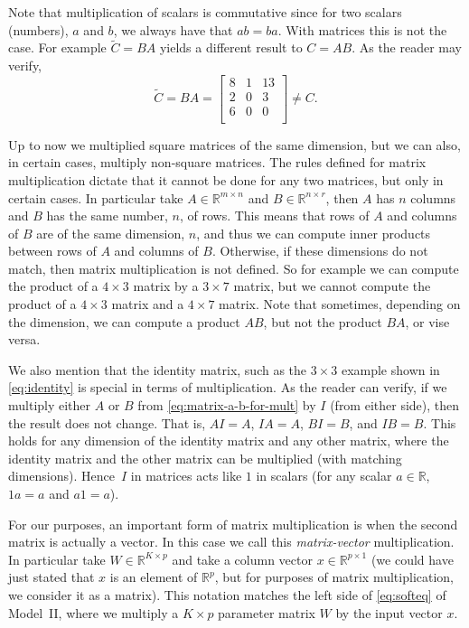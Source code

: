 Note that multiplication of scalars is commutative since for two scalars (numbers), $a$ and $b$, we always have that $ab = ba$. With matrices this is not the case. For example $\tilde{C}=BA$ yields a different result to $C= AB$. As the reader may verify,
%
\begin{equation}
\label{eq:matrix-example-2}
\tilde{C} = BA = 
\begin{bmatrix}
8 & 1 & 13 \\
2 & 0 & 3 \\
6 & 0 & 0 \\
\end{bmatrix}
\neq C.
\end{equation}
%

Up to now we multiplied square matrices of the same dimension, but we can also, in certain cases, multiply non-square matrices. The rules defined for matrix multiplication dictate that it cannot be done for any two matrices, but only in certain cases. In particular take $A \in {\mathbb R}^{m \times n}$ and $B \in {\mathbb R}^{n \times r}$, then $A$ has $n$ columns and $B$ has the same number, $n$, of rows. This means that rows of $A$ and columns of $B$ are of the same dimension, $n$, and thus we can compute inner products between rows of $A$ and columns of $B$. Otherwise, if these dimensions do not match, then matrix multiplication is not defined. So for example we can compute the product of a $4 \times 3$ matrix by a $3 \times 7$ matrix, but we cannot compute the product of a $4 \times 3$ matrix and a $4 \times 7$ matrix. Note that sometimes, depending on the dimension, we can compute a product $AB$, but not the product $BA$, or vise versa.

We also mention that the identity matrix, such as the $3 \times 3$ example shown in \eqref{eq:identity} is special in terms of multiplication. As the reader can verify, if we multiply either $A$ or $B$ from \eqref{eq:matrix-a-b-for-mult} by $I$ (from either side), then the result does not change. That is, $AI = A$, $IA = A$, $BI = B$, and $IB = B$. This holds for any dimension of the identity matrix and any other matrix, where the identity matrix and the other matrix can be multiplied (with matching dimensions). Hence~$I$ in matrices acts like $1$ in scalars (for any scalar $a \in {\mathbb R}$, $1a = a$ and $a1 = a$).

For our purposes, an important form of matrix multiplication is when the second matrix is actually a vector. In this case we call this {\em matrix-vector} multiplication. In particular take $W \in {\mathbb R}^{K \times p}$ and take a column vector $x \in {\mathbb R}^{p \times 1}$ (we could have just stated that $x$ is an element of ${\mathbb R}^p$, but for purposes of matrix multiplication, we consider it as a matrix). This notation matches the left side of \eqref{eq:softeq} of Model~II, where we multiply a $K \times p$ parameter matrix $W$ by the input vector $x$. 

